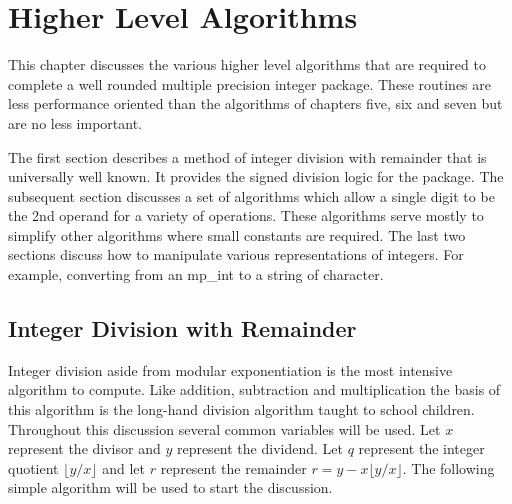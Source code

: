 \documentclass[b5paper]{book}
\begin{document}
\chapter{Higher Level Algorithms}

This chapter discusses the various higher level algorithms that are required to complete a well rounded multiple precision integer package.  These
routines are less performance oriented than the algorithms of chapters five, six and seven but are no less important.  

The first section describes a method of integer division with remainder that is universally well known.  It provides the signed division logic
for the package.  The subsequent section discusses a set of algorithms which allow a single digit to be the 2nd operand for a variety of operations.  
These algorithms serve mostly to simplify other algorithms where small constants are required.  The last two sections discuss how to manipulate 
various representations of integers.  For example, converting from an mp\_int to a string of character.

\section{Integer Division with Remainder}
\label{sec:division}

Integer division aside from modular exponentiation is the most intensive algorithm to compute.  Like addition, subtraction and multiplication
the basis of this algorithm is the long-hand division algorithm taught to school children.  Throughout this discussion several common variables
will be used.  Let $x$ represent the divisor and $y$ represent the dividend.  Let $q$ represent the integer quotient $\lfloor y / x \rfloor$ and 
let $r$ represent the remainder $r = y - x \lfloor y / x \rfloor$.  The following simple algorithm will be used to start the discussion.
\end{document}
